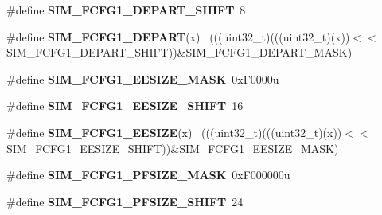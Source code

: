 \begin{DoxyCompactItemize}
\item 
\hypertarget{group___s_i_m___register___masks_ga828f3d67b0fb411b1f32f5ac8105964f}{}\#define {\bfseries S\+I\+M\+\_\+\+F\+C\+F\+G1\+\_\+\+D\+E\+P\+A\+R\+T\+\_\+\+S\+H\+I\+F\+T}~8\label{group___s_i_m___register___masks_ga828f3d67b0fb411b1f32f5ac8105964f}

\item 
\hypertarget{group___s_i_m___register___masks_ga81f370e7d63223fa868ec79e3cbd3475}{}\#define {\bfseries S\+I\+M\+\_\+\+F\+C\+F\+G1\+\_\+\+D\+E\+P\+A\+R\+T}(x)                                        ~(((uint32\+\_\+t)(((uint32\+\_\+t)(x))$<$$<$S\+I\+M\+\_\+\+F\+C\+F\+G1\+\_\+\+D\+E\+P\+A\+R\+T\+\_\+\+S\+H\+I\+F\+T))\&S\+I\+M\+\_\+\+F\+C\+F\+G1\+\_\+\+D\+E\+P\+A\+R\+T\+\_\+\+M\+A\+S\+K)\label{group___s_i_m___register___masks_ga81f370e7d63223fa868ec79e3cbd3475}

\item 
\hypertarget{group___s_i_m___register___masks_gaf02a0b5e053242559c12e5d2834fd3c4}{}\#define {\bfseries S\+I\+M\+\_\+\+F\+C\+F\+G1\+\_\+\+E\+E\+S\+I\+Z\+E\+\_\+\+M\+A\+S\+K}~0x\+F0000u\label{group___s_i_m___register___masks_gaf02a0b5e053242559c12e5d2834fd3c4}

\item 
\hypertarget{group___s_i_m___register___masks_ga7e203fc4aaf06a3dbd257768f53dbf83}{}\#define {\bfseries S\+I\+M\+\_\+\+F\+C\+F\+G1\+\_\+\+E\+E\+S\+I\+Z\+E\+\_\+\+S\+H\+I\+F\+T}~16\label{group___s_i_m___register___masks_ga7e203fc4aaf06a3dbd257768f53dbf83}

\item 
\hypertarget{group___s_i_m___register___masks_gaa924dcc0612f8baadc55ee4c954a5702}{}\#define {\bfseries S\+I\+M\+\_\+\+F\+C\+F\+G1\+\_\+\+E\+E\+S\+I\+Z\+E}(x)                                        ~(((uint32\+\_\+t)(((uint32\+\_\+t)(x))$<$$<$S\+I\+M\+\_\+\+F\+C\+F\+G1\+\_\+\+E\+E\+S\+I\+Z\+E\+\_\+\+S\+H\+I\+F\+T))\&S\+I\+M\+\_\+\+F\+C\+F\+G1\+\_\+\+E\+E\+S\+I\+Z\+E\+\_\+\+M\+A\+S\+K)\label{group___s_i_m___register___masks_gaa924dcc0612f8baadc55ee4c954a5702}

\item 
\hypertarget{group___s_i_m___register___masks_ga5adf627ba4cd9516ebf3e0a6d33aa7c5}{}\#define {\bfseries S\+I\+M\+\_\+\+F\+C\+F\+G1\+\_\+\+P\+F\+S\+I\+Z\+E\+\_\+\+M\+A\+S\+K}~0x\+F000000u\label{group___s_i_m___register___masks_ga5adf627ba4cd9516ebf3e0a6d33aa7c5}

\item 
\hypertarget{group___s_i_m___register___masks_gaec8960bc114f5539e22701491dcf58f7}{}\#define {\bfseries S\+I\+M\+\_\+\+F\+C\+F\+G1\+\_\+\+P\+F\+S\+I\+Z\+E\+\_\+\+S\+H\+I\+F\+T}~24\label{group___s_i_m___register___masks_gaec8960bc114f5539e22701491dcf58f7}


\end{DoxyCompactItemize}
